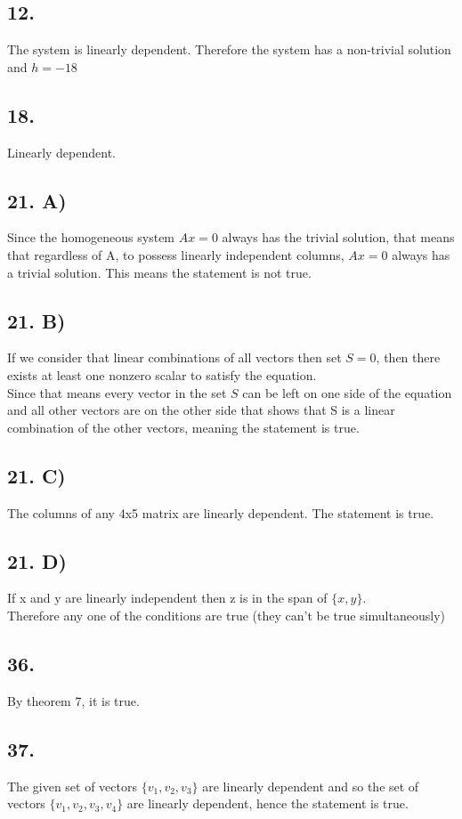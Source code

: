 \documentclass[12]{scrartcl}
\begin{document}
\subsection*{12.}
The system is linearly dependent. Therefore the system has a non-trivial solution and $h = -18$
\subsection*{18.}
Linearly dependent. 
\subsection*{21. A)}
Since the homogeneous system $Ax = 0$ always has the trivial solution, that means that regardless of A, to possess linearly independent columns, $Ax = 0$ always has a trivial solution. This means the statement is not true. 
\subsection*{21. B)}
If we consider that linear combinations of all vectors then set $S = 0$, then there exists at least one nonzero scalar to satisfy the equation. \\
Since that means every vector in the set $S$ can be left on one side of the equation and all other vectors are on the other side that shows that S is a linear combination of the other vectors, meaning the statement is true. \\
\subsection*{21. C)}
The columns of any 4x5 matrix are linearly dependent. The statement is true. 
\subsection*{21. D)}
If x and y are linearly independent then z is in the span of $\{x,y\}$. \\
Therefore any one of the conditions are true (they can't be true simultaneously) 
\subsection*{36.}
By theorem 7, it is true. 
\subsection*{37.}
The given set of vectors $\{v_1, v_2, v_3\}$ are linearly dependent and so the set of vectors $\{v_1, v_2, v_3, v_4\}$ are linearly dependent, hence the statement is true. 
\end{document}
